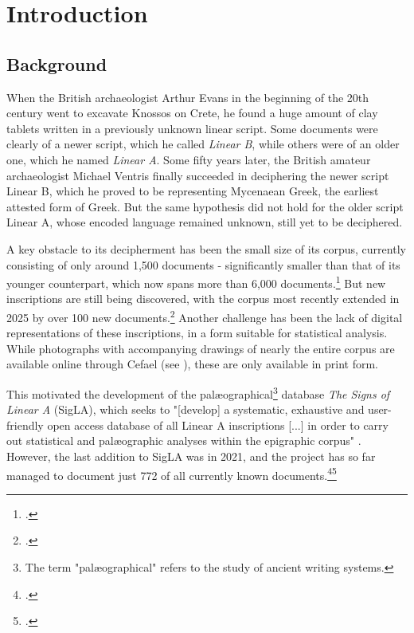 \chapter{Introduction}
\label{ch:Introduction}
\section{Background}

When the British archaeologist Arthur Evans in the beginning of the 20th century went to excavate Knossos on Crete, he found a huge amount of clay tablets written in a previously unknown linear script.
Some documents were clearly of a newer script, which he called \textit{Linear B}, while others were of an older one, which he named \textit{Linear A}.
Some fifty years later, the British amateur archaeologist Michael Ventris finally succeeded in deciphering the newer script Linear B, which he proved to be representing Mycenaean Greek, the earliest attested form of Greek.
But the same hypothesis did not hold for the older script Linear A, whose encoded language remained unknown, still yet to be deciphered.

A key obstacle to its decipherment has been the small size of its corpus, currently consisting of only around 1,500 documents - significantly smaller than that of its younger counterpart, which now spans more than 6,000 documents.\footcite{SteeleAegeanWriting2023} 
But new inscriptions are still being discovered, with the corpus most recently extended in 2025 by over 100 new documents.\footcite{CNRLinearACorpus2025}
Another challenge has been the lack of digital representations of these inscriptions, in a form suitable for statistical analysis.
While photographs with accompanying drawings of nearly the entire corpus are available online through \acf{Cefael} (see \textcite{EtudesCretoises21}), these are only available in print form.

This motivated the development of the palæographical\footnote{The term "palæographical" refers to the study of ancient writing systems.} database \textit{The Signs of Linear A} (SigLA), which seeks to "[develop] a systematic, exhaustive and user-friendly open access database of all Linear A inscriptions [...] in order to carry out statistical and palæographic analyses within the epigraphic corpus" \parencite{SalgarellaCastellanSigLA2020}.
However, the last addition to SigLA was in 2021, and the project has so far managed to document just 772 of all currently known documents.\footcite{SigLAAboutPage}\footcite{SigLASearchDocuments}

